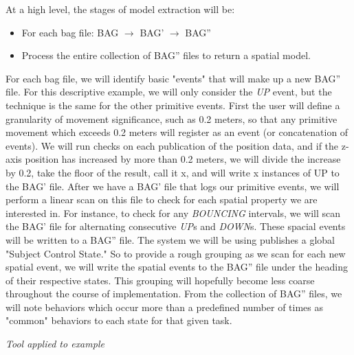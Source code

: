 \documentclass{article}
\begin{document}
At a high level, the stages of model extraction will be:

\begin{itemize}
  \item For each bag file: BAG $\rightarrow$ BAG' $\rightarrow$ BAG'' 

  \item Process the entire collection of BAG'' files to return a spatial model.
\end{itemize}


For each bag file, we will identify basic "events" that will make up a new BAG'' file.  
For this descriptive example, we will only consider the \emph{UP} event, but the technique is the same for the other primitive events.  
First the user will define a granularity of movement significance, such as 0.2 meters, so that any primitive movement which exceeds 0.2 meters will register as an event (or concatenation of events).
We will run checks on each publication of the position data, and if the z-axis position has increased by more than 0.2 meters, we will divide the increase by 0.2, take the floor of the result, call it x, and will write x instances of UP to the BAG' file.  
After we have a BAG' file that logs our primitive events, we will perform a linear scan on this file to check for each spatial property we are interested in.  
For instance, to check for any \emph{BOUNCING} intervals, we will scan the BAG' file for alternating consecutive \emph{UP}s and \emph{DOWN}s. 
These spacial events will be written to a BAG'' file.
The system we will be using publishes a global "Subject Control State."
So to provide a rough grouping as we scan for each new spatial event, we will write the spatial events to the BAG'' file under the heading of their respective states.
This grouping will hopefully become less coarse throughout the course of implementation.
From the collection of BAG'' files, we will note behaviors which occur more than a predefined number of times as "common" behaviors to each state for that given task.

\emph{Tool applied to example}

\end{document}
